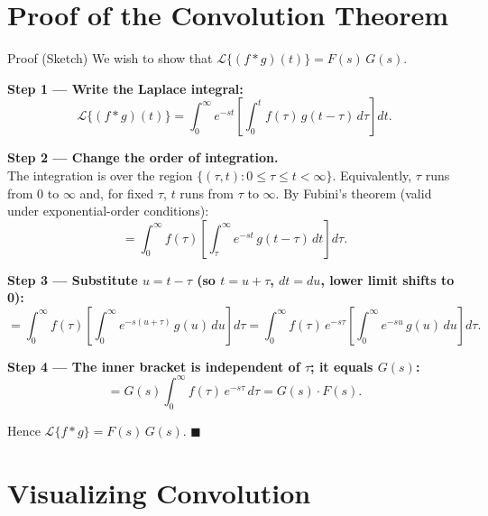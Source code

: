 \documentclass[12pt,a4paper]{article}
\begin{document}
\section{Proof of the Convolution Theorem}

\begin{infobox}{Proof (Sketch)}
We wish to show that
$\mathcal{L}\{(f*g)(t)\} = F(s)\,G(s)$.

\medskip
\textbf{Step 1 --- Write the Laplace integral:}
\[
  \mathcal{L}\{(f*g)(t)\}
  = \int_0^\infty e^{-st}\!\left[\int_0^t f(\tau)\,g(t-\tau)\,d\tau\right]dt.
\]

\medskip
\textbf{Step 2 --- Change the order of integration.}\\
The integration is over the region $\{(\tau,t): 0\le\tau\le t<\infty\}$.
Equivalently, $\tau$ runs from $0$ to $\infty$ and, for fixed $\tau$, $t$ runs from $\tau$
to $\infty$.  By Fubini's theorem (valid under exponential-order conditions):
\[
  = \int_0^\infty f(\tau)\!\left[\int_\tau^\infty e^{-st}\,g(t-\tau)\,dt\right]d\tau.
\]

\medskip
\textbf{Step 3 --- Substitute $u = t-\tau$ (so $t=u+\tau$, $dt=du$, lower limit shifts to 0):}
\[
  = \int_0^\infty f(\tau)\!\left[\int_0^\infty e^{-s(u+\tau)}\,g(u)\,du\right]d\tau
  = \int_0^\infty f(\tau)\,e^{-s\tau}\!\left[\int_0^\infty e^{-su}\,g(u)\,du\right]d\tau.
\]

\medskip
\textbf{Step 4 --- The inner bracket is independent of $\tau$; it equals $G(s)$:}
\[
  = G(s)\int_0^\infty f(\tau)\,e^{-s\tau}\,d\tau = G(s)\cdot F(s).
\]

\medskip
Hence $\mathcal{L}\{f*g\} = F(s)\,G(s)$. \hfill$\blacksquare$
\end{infobox}

\section{Visualizing Convolution}
\end{document}
